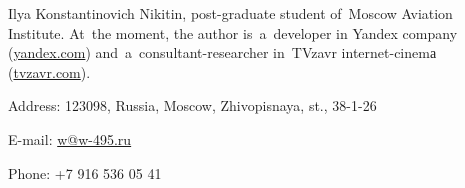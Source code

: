 

Ilya Konstantinovich Nikitin, post-graduate student of~Moscow Aviation Institute.
At~the moment, the author is~a~developer in Yandex company
(\href{http://yandex.com}{yandex.com})
and~a~consultant-researcher in~TVzavr internet-cinemа
(\href{http://tvzavr.com}{tvzavr.com}).

Address: 123098, Russia, Moscow, Zhivopisnaya, st., 38-1-26

E-mail: \href{mailto:w@w-495.ru}{w@w-495.ru}

Phone: +7 916 536 05 41
